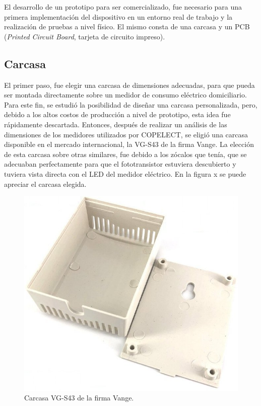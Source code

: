 El desarrollo de un prototipo para ser comercializado, fue necesario para una primera implementación del dispositivo en un entorno real de trabajo y la realización de pruebas a nivel físico. El mismo consta de una carcasa y un PCB (\textit{Printed Circuit Board}, tarjeta de circuito impreso).

\subsection{Carcasa}

El primer paso, fue elegir una carcasa de dimensiones adecuadas, para que pueda ser montada directamente sobre un medidor de consumo eléctrico domiciliario. Para este fin, se estudió la posibilidad de diseñar una carcasa personalizada, pero, debido a los altos costos de producción a nivel de prototipo, esta idea fue rápidamente descartada. Entonces, después de realizar un análisis de las dimensiones de los medidores utilizados por COPELECT, se eligió una carcasa disponible en el mercado internacional, la VG-S43 de la firma Vange. La elección de esta carcasa sobre otras similares, fue debido a los zócalos que tenía, que se adecuaban perfectamente para que el fototransistor estuviera descubierto y tuviera vista directa con el LED del medidor eléctrico. En la figura x se puede apreciar el carcasa elegida.

\begin{figure}[h]
	\centering
	\includegraphics[scale=0.5]{./Figures/case.jpg}
	\caption{Carcasa VG-S43 de la firma Vange\protect\footnotemark.}
		\label{fig:cuadradoAzul}
\end{figure}


